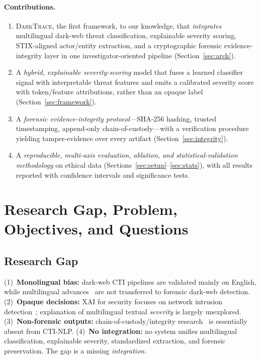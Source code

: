 \documentclass[11pt,a4paper]{article}
\newcommand{\framework}{\textsc{DarkTrace}}
\begin{document}
\paragraph{Contributions.}
\begin{enumerate}[leftmargin=1.4em]
  \item \framework{}, the first framework, to our knowledge, that \emph{integrates}
  multilingual dark-web threat classification, explainable severity scoring,
  STIX-aligned actor/entity extraction, and a cryptographic forensic evidence-integrity
  layer in one investigator-oriented pipeline (Section~\ref{sec:arch}).
  \item A \emph{hybrid, explainable severity-scoring} model that fuses a learned
  classifier signal with interpretable threat features and emits a calibrated severity
  score with token/feature attributions, rather than an opaque label
  (Section~\ref{sec:framework}).
  \item A \emph{forensic evidence-integrity protocol}---SHA-256 hashing, trusted
  timestamping, append-only chain-of-custody---with a verification procedure yielding
  tamper-evidence over every artifact (Section~\ref{sec:integrity}).
  \item A \emph{reproducible, multi-axis evaluation, ablation, and statistical-validation
  methodology} on ethical data (Sections~\ref{sec:setup}--\ref{sec:stats}), with all
  results reported with confidence intervals and significance tests.
\end{enumerate}

\section{Research Gap, Problem, Objectives, and Questions}\label{sec:gap}

\subsection{Research Gap}
(1)~\textbf{Monolingual bias:} dark-web CTI pipelines are validated mainly on English,
while multilingual advances~\cite{pakray2025nlp,nazir2025multilingual,alharbi2025bert}
are not transferred to forensic dark-web detection. (2)~\textbf{Opaque decisions:} XAI
for security focuses on network intrusion
detection~\cite{gaspar2024xai,hermosilla2025xai,kalakoti2025evaluating}; explanation of
multilingual textual \emph{severity} is largely unexplored. (3)~\textbf{Non-forensic
outputs:} chain-of-custody/integrity research~\cite{lone2019forensicchain,loffi2025management,ali2022procedure}
is essentially absent from CTI-NLP. (4)~\textbf{No integration:} no system unifies
multilingual classification, explainable severity, standardized extraction, and forensic
preservation. The gap is a missing \emph{integration}.
\end{document}
